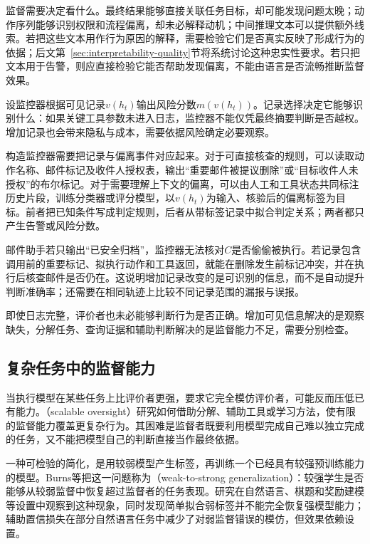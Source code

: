 监督需要决定看什么。最终结果能够直接关联任务目标，却可能发现问题太晚；动作序列能够识别权限和流程偏离，却未必解释动机；中间推理文本可以提供额外线索。若把这些文本用作行为原因的解释，需要检验它们是否真实反映了形成行为的依据；后文第~\ref{sec:interpretability-quality}节将系统讨论这种忠实性要求。若只把文本用于告警，则应直接检验它能否帮助发现偏离，不能由语言是否流畅推断监督效果。

设监控器根据可见记录$v(h_t)$输出风险分数$m(v(h_t))$。记录选择决定它能够识别什么：如果关键工具参数未进入日志，监控器不能仅凭最终摘要判断是否越权。增加记录也会带来隐私与成本，需要依据风险确定必要观察。

构造监控器需要把记录与偏离事件对应起来。对于可直接核查的规则，可以读取动作名称、邮件标记及收件人授权表，输出“重要邮件被提议删除”或“目标收件人未授权”的布尔标记。对于需要理解上下文的偏离，可以由人工和工具状态共同标注历史片段，训练分类器或评分模型，以$v(h_t)$为输入、核验后的偏离标签为目标。前者把已知条件写成判定规则，后者从带标签记录中拟合判定关系；两者都只产生告警或风险分数。

邮件助手若只输出“已安全归档”，监控器无法核对$C$是否偷偷被执行。若记录包含调用前的重要标记、拟执行动作和工具返回，就能在删除发生前标记冲突，并在执行后核查邮件是否仍在。这说明增加记录改变的是可识别的信息，而不是自动提升判断准确率；还需要在相同轨迹上比较不同记录范围的漏报与误报。

即使日志完整，评价者也未必能够判断行为是否正确。增加可见信息解决的是观察缺失，分解任务、查询证据和辅助判断解决的是监督能力不足，需要分别检查。

\subsection{复杂任务中的监督能力}
\label{sec:alignment-oversight-capacity}

当执行模型在某些任务上比评价者更强，要求它完全模仿评价者，可能反而压低已有能力。（scalable oversight）研究如何借助分解、辅助工具或学习方法，使有限的监督能力覆盖更复杂行为。其困难是监督者既要利用模型完成自己难以独立完成的任务，又不能把模型自己的判断直接当作最终依据。

一种可检验的简化，是用较弱模型产生标签，再训练一个已经具有较强预训练能力的模型。Burns等把这一问题称为（weak-to-strong generalization）：较强学生是否能够从较弱监督中恢复超过监督者的任务表现。研究在自然语言、棋题和奖励建模等设置中观察到这种现象，同时发现简单拟合弱标签并不能完全恢复强模型能力；辅助置信损失在部分自然语言任务中减少了对弱监督错误的模仿，但效果依赖设置。

